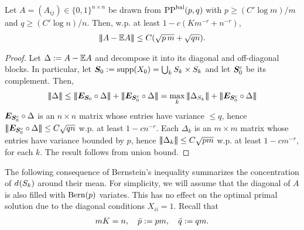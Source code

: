 \begin{cor}\label{cor:adj:concent:SDP2}
  Let $A = (A_{ij}) \in \{0,1\}^{n \times n}$ be drawn from $\text{PP}^{\text{bal}}(p,q)$ with $p \ge (C' \log m)/m $ and $q \ge (C' \log n)/ n$. Then, w.p. at least $1- c (K m^{-r}+ n^{-r})$, 
  \begin{align*}
    |\!|\!|A-\mathbb{E} A|\!|\!| \le C (\sqrt{p\, m} + \sqrt{q n}).
  \end{align*}
\end{cor}
\begin{proof}
  Let $\Delta:= A - \mathbb{E} A$ and decompose it into its diagonal and off-diagonal blocks. In particular, let $\bm{S}_0 := \operatorname{supp}(X_0) = \bigcup_k S_{k} \times S_{k}$ and let $\bm{S}_0^c$ be its complement. Then,
  \begin{align*}
    \mnorm{\Delta} \le  \mnorm{\onem_{\Stru} \circ \Delta} +  \mnorm{\onem_{\Stru^c} \circ \Delta} = \max_k \mnorm{\Delta_{\subb{k}}} +  \mnorm{\onem_{\Stru^c} \circ \Delta}
  \end{align*}
  $\bm{E}_{\bm{S}_0^c} \circ \Delta$ is an $n \times n$ matrix whose entries have variance $\le q$, hence $|\!|\!|\bm{E}_{\bm{S}_0^c} \circ \Delta|\!|\!| \le C \sqrt{q n}$ w.p. at least $1-cn^{-r}$. Each $\Delta_k$ is an $m \times m$ matrix whose entries have variance bounded by $p$, hence $|\!|\!|\Delta_k|\!|\!| \le C \sqrt{pm}$ w.p. at least $1-c m^{-r}$, for each $k$. The result follows from union bound.
\end{proof}



The following consequence of Bernstein's inequality summarizes the concentration of $d_{}(S_{k})$ around their mean. For simplicity, we will assume that the diagonal of $A$ is also filled with $\operatorname{Bern}(p)$ variates. This has no effect on the optimal primal solution due to the diagonal conditions $X_{ii} = 1$. Recall that
\begin{align*}
  m K = n, \quad \bar{p} := p m, \quad \bar{q} := q m.
\end{align*}

